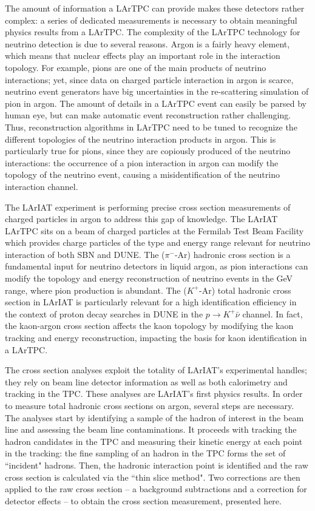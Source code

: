 The amount of information a LArTPC can provide makes these detectors rather complex: a series of dedicated measurements is necessary to obtain meaningful physics results from a LArTPC. The complexity of the LArTPC technology for neutrino detection is due to several reasons. Argon is a fairly heavy element, which means that nuclear effects play an important role in the interaction topology. For example, pions are one of the main products of neutrino interactions; yet,  since data on charged particle interaction in argon is scarce, neutrino event generators have big uncertainties in the re-scattering simulation of pion in argon. %
The amount of details in a LArTPC event can easily be parsed by human eye, but can make automatic event reconstruction rather challenging. Thus, reconstruction algorithms in LArTPC need to be tuned to recognize the different topologies of the neutrino interaction products in argon. This is particularly true for pions, since they are copiously produced of the neutrino interactions: the occurrence of a pion interaction in argon can modify the topology of the neutrino event, causing a misidentification of the neutrino interaction channel.

The LArIAT \cite{Cavanna:2014iqa} experiment is performing precise cross section measurements of charged particles in argon to address this gap of knowledge. 
The LArIAT LArTPC sits on a beam of charged particles at the Fermilab Test Beam Facility which provides charge particles of the type and energy range relevant for neutrino interaction of both SBN and DUNE. The ($\pi^-$-Ar) hadronic cross section is a fundamental input for neutrino detectors in liquid argon, as pion interactions can modify the topology and energy reconstruction of neutrino events in the GeV range, where pion production is abundant. The  ($K^+$-Ar) total hadronic cross section in LArIAT is particularly relevant for a high identification efficiency in the context of proton decay searches in DUNE in the  $p\rightarrow K^+\bar{\nu}$  channel. In fact, the kaon-argon cross section affects the kaon topology by modifying the kaon tracking and energy reconstruction, impacting the basis for kaon identification in a LArTPC.  

The cross section analyses exploit the totality of LArIAT's experimental handles; they rely on beam line detector information as well as both calorimetry and tracking in the TPC. These analyses are LArIAT's first physics results. 
In order to measure total hadronic cross sections on argon, several steps are necessary. The analyses start by identifying a sample of the hadron of interest in the beam line and assessing the beam line contaminations. It proceeds with tracking the hadron candidates in the TPC and measuring their kinetic energy at each point in the tracking: the fine sampling of an hadron in the TPC forms the set of ``incident" hadrons.  Then, the hadronic interaction point is identified and the raw cross section is calculated via the ``thin slice method". Two corrections are then applied to the raw cross section -- a background subtractions and a correction for detector effects -- to obtain the cross section measurement, presented here.\\

